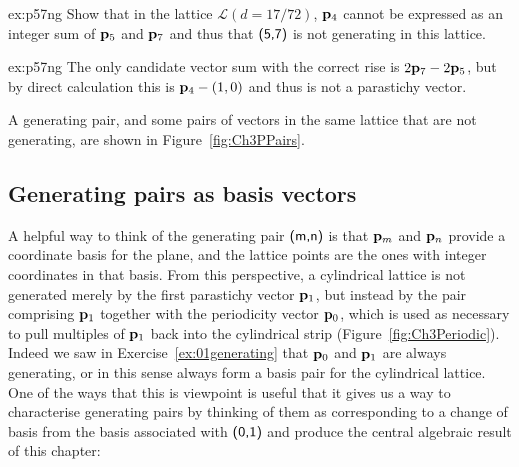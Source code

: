 \begin{jExercise}{ex:p57ng}
	Show that in the lattice $\mathcal{L}(d=17/72)$, ${\mathbf p}_{4}$ cannot be expressed as an integer sum of ${\mathbf p}_{5}$ and ${\mathbf p}_{7}$ and thus that $\textsf{(5,7)}$ is not generating in this lattice.
\end{jExercise}
\begin{jAnswer}{ex:p57ng}
	The only candidate vector sum with the correct rise is $2{\mathbf p}_{7}-2{\mathbf p}_{5}$, but by direct calculation this is ${\mathbf p}_{4}-(1,0)$ and thus is not a parastichy vector. 
\end{jAnswer}

A generating pair, and some pairs of vectors in the same lattice that are not generating, are shown in Figure~\ref{fig:Ch3PPairs}.

\subsection{Generating pairs as basis vectors}
 A helpful way to think of the generating pair $\textsf{(m,n)}$ is that  ${\mathbf p}_{m}$ and ${\mathbf p}_{n}$ provide a coordinate basis for the plane, and the lattice points are the ones with integer coordinates in that basis. From this perspective, a cylindrical lattice is not generated merely by the first parastichy vector ${\mathbf p}_{1}$, but instead by  the pair comprising  ${\mathbf p}_{1}$ together with the periodicity vector ${\mathbf p}_{0}$, which is used as necessary to pull multiples of ${\mathbf p}_{1}$ back into the cylindrical strip (Figure~\ref{fig:Ch3Periodic}).
 Indeed we saw in Exercise~\ref{ex:01generating} that ${\mathbf p}_{0}$ and ${\mathbf p}_{1}$ are always generating, or in this sense always form a basis pair for the cylindrical lattice. 
 One of the ways that this is viewpoint is useful  that it gives us a way to characterise generating pairs by thinking of them as corresponding to a change of basis from the basis associated with $\textsf{(0,1)}$ and produce the central algebraic result of this chapter:

